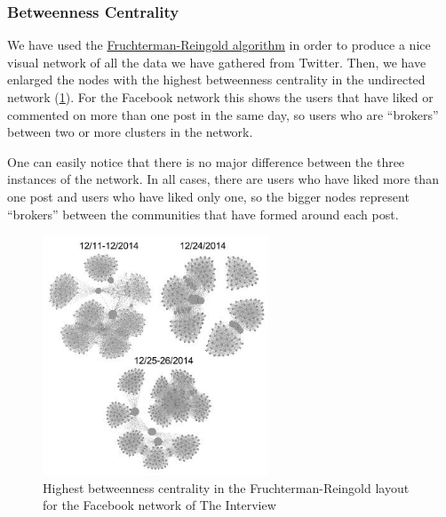 \documentclass{llncs}
\begin{document}
\subsubsection{Betweenness Centrality}
We have used the
\href{https://github.com/gephi/gephi/wiki/Fruchterman-Reingold}{Fruchterman-Reingold
algorithm} in order to produce a nice visual network of all the data we have
gathered from Twitter. Then, we have enlarged the nodes with the highest
betweenness centrality in the undirected network
(\ref{fig:interview-facebook-betweennes-centrality}). For the Facebook network
this shows the users that have liked or commented on more than one post in the
same day, so users who are “brokers” between two or more clusters in the
network.

One can easily notice that there is no major difference between the three
instances of the network. In all cases, there are users who have liked more than
one post and users who have liked only one, so the bigger nodes represent
“brokers” between the communities that have formed around each post.
%
\begin{figure}
\centering
\includegraphics[width=0.6\textwidth]{interview-facebook-betweennes-centrality.jpg}
\caption{Highest betweenness centrality in the Fruchterman-Reingold layout for
    the Facebook network of The Interview
\label{fig:interview-facebook-betweennes-centrality}}
\end{figure}
%
\end{document}
